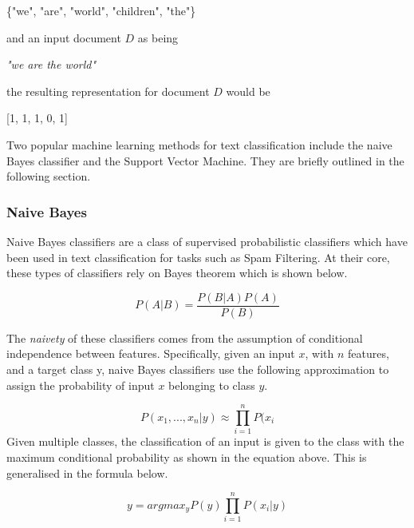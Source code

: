 \begin{center}
\{"we", "are", "world", "children", "the"\}
\end{center}

\noindent
\newline 
and an input document \(D\) as being 

\begin{center}
\textit{"we are the world"} 
\end{center}

\noindent
\newline
the resulting representation for document \(D\) would be

\begin{center}
 [1, 1, 1, 0, 1] 
\end{center}


\noindent
\newline
Two popular machine learning methods for text classification include the naive Bayes classifier and the Support Vector Machine. They are briefly outlined in the following section.

\subsubsection{Naive Bayes}
Naive Bayes classifiers are a class of supervised probabilistic classifiers which have been used in text classification for tasks such as Spam Filtering. At their core, these types of classifiers rely on Bayes theorem which is shown below.

\begin{equation}
P(A|B) = \dfrac{P(B|A)P(A)}{P(B)}
\end{equation}

\noindent
The \textit{naivety} of these classifiers comes from the assumption of conditional independence between features. Specifically, given an input \(x\), with \(n\) features, and a target class y, naive Bayes classifiers use the following approximation to assign the probability of input \(x\) belonging to class \(y\).

\begin{equation}
P(x_{1},...,x_{n}|y) \approx \prod_{i=1}^{n}P(x_{i}
\end{equation}
\noindent
Given multiple classes, the classification of an input is given to the class with the maximum conditional probability as shown in the equation above. This is generalised in the formula below.

\begin{equation}
y = argmax_{y} P(y) \prod_{i=1}^{n}P(x_{i} | y)
\end{equation}

